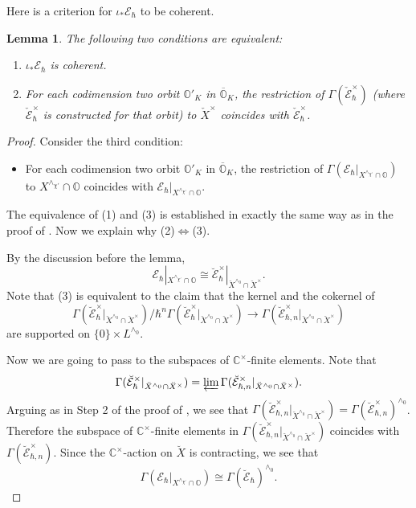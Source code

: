 \documentclass[12pt]{amsart}
\newcommand{\C}{\mathbb{C}}
\newcommand{\Orb}{\mathbb{O}}
\newcommand{\Ecal}{\mathcal{E}}
\newtheorem{Lem}[Thm]{Lemma}
\theoremstyle{definition}
\numberwithin{equation}{section}
\begin{document}
Here is a criterion for $\iota_*\mathcal{E}_\hbar$ to be coherent.

\begin{Lem}\label{Lem:coh_extension1}
The following two conditions are equivalent:
\begin{enumerate}
\item $\iota_*\mathcal{E}_\hbar$ is coherent.
\item For each codimension two orbit $\Orb'_K$ in $\overline{\Orb}_K$,
the restriction of $\Gamma(\check{\mathcal{E}}^\times_\hbar)$ (where $\check{\mathcal{E}}^\times_\hbar$
is constructed for that orbit) to $\check{X}^\times$ coincides with $\check{\Ecal}^\times_\hbar$.
\end{enumerate}
\end{Lem}
\begin{proof}
Consider the third condition:
\begin{itemize}
\item[(3)] For each codimension two orbit $\Orb'_K$ in $\overline{\Orb}_K$,
the restriction of $\Gamma(\mathcal{E}_\hbar|_{X^{\wedge_{\chi'}}\cap \Orb})$ to $X^{\wedge_{\chi'}}\cap\Orb$ coincides with $\mathcal{E}_\hbar|_{X^{\wedge_{\chi'}}\cap \Orb}$.
\end{itemize}
The equivalence of (1) and (3) is established in exactly the same way as in
the proof of \cite[Lemma 3.4]{HC_symp}. Now we explain why (2)$\Leftrightarrow$(3).

By the discussion before the lemma,
$$\mathcal{E}_\hbar|_{X^{\wedge_{\chi'}}\cap \Orb}\cong \breve{\Ecal}^\times_\hbar|_{\breve{X}^{\wedge_0}\cap\breve{X}^\times}.$$
Note that (3) is equivalent to the claim that the kernel and the cokernel
of
$$\Gamma(\breve{\Ecal}^\times_\hbar|_{\breve{X}^{\wedge_0}\cap\breve{X}^\times})/
\hbar^n \Gamma(\breve{\Ecal}^\times_\hbar|_{\breve{X}^{\wedge_0}\cap\breve{X}^\times})
\rightarrow \Gamma(\breve{\Ecal}^\times_{\hbar,n}|_{\breve{X}^{\wedge_0}\cap\breve{X}^\times})$$
are supported on $\{0\}\times L^{\wedge_0}$.

Now we are going to pass to the subspaces of $\C^\times$-finite elements.  Note that
$$\Gamma(\breve{\Ecal}^\times_\hbar|_{\breve{X}^{\wedge_0}\cap\breve{X}^\times})=
\varprojlim \Gamma(\breve{\Ecal}^\times_{\hbar,n}|_{\breve{X}^{\wedge_0}\cap\breve{X}^\times}).$$
Arguing as in Step 2 of the proof of \cite[Lemma 3.4]{HC_symp}, we see that
$\Gamma(\breve{\Ecal}^\times_{\hbar,n}|_{\breve{X}^{\wedge_0}\cap\breve{X}^\times})=
\Gamma(\breve{\Ecal}^\times_{\hbar,n})^{\wedge_0}$.
Therefore the subspace of $\C^\times$-finite elements in $\Gamma(\breve{\Ecal}^\times_{\hbar,n}|_{\breve{X}^{\wedge_0}\cap\breve{X}^\times})$
coincides with $\Gamma(\breve{\Ecal}^\times_{\hbar,n})$. Since the $\C^\times$-action on
$\breve{X}$ is contracting, we see that
\begin{equation}\label{eq:completion_coincide11}
\Gamma(\mathcal{E}_\hbar|_{X^{\wedge_{\chi'}}\cap \Orb})\cong \Gamma(\breve{\mathcal{E}}_\hbar)^{\wedge_0}.
\end{equation}


\end{proof}
\end{document}

